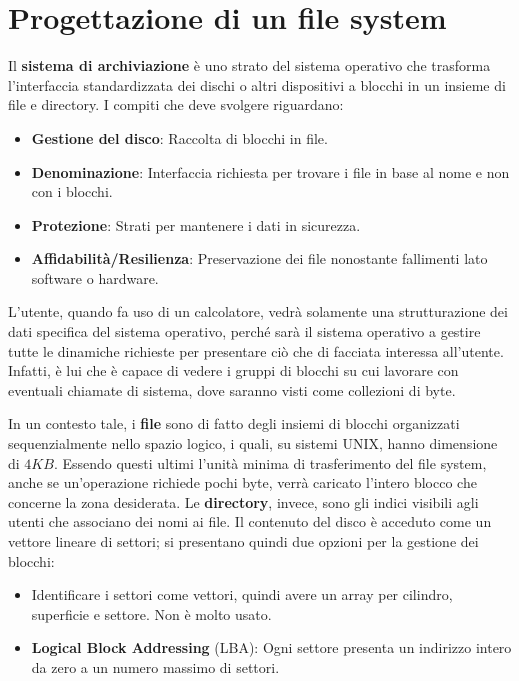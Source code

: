 \section{Progettazione di un file system} %
Il \textbf{sistema di archiviazione} è uno strato del sistema operativo che trasforma l'interfaccia standardizzata dei dischi o altri dispositivi a
blocchi in un insieme di file e directory. I compiti che deve svolgere riguardano: \begin{itemize}
    \item \textbf{Gestione del disco}: Raccolta di blocchi in file.
    \item \textbf{Denominazione}: Interfaccia richiesta per trovare i file in base al nome e non con i blocchi.
    \item \textbf{Protezione}: Strati per mantenere i dati in sicurezza.
    \item \textbf{Affidabilità/Resilienza}: Preservazione dei file nonostante fallimenti lato software o hardware.
\end{itemize}

\noindent L'utente, quando fa uso di un calcolatore, vedrà solamente una strutturazione dei dati specifica del sistema operativo, perché sarà il sistema
operativo a gestire tutte le dinamiche richieste per presentare ciò che di facciata interessa all'utente. Infatti, è lui che è capace di vedere i gruppi
di blocchi su cui lavorare con eventuali chiamate di sistema, dove saranno visti come collezioni di byte.\par
In un contesto tale, i \textbf{file} sono di fatto degli insiemi di blocchi organizzati sequenzialmente nello spazio logico, i quali, su sistemi UNIX,
hanno dimensione di $4KB$. Essendo questi ultimi l'unità minima di trasferimento del file system, anche se un'operazione richiede pochi byte, verrà
caricato l'intero blocco che concerne la zona desiderata. Le \textbf{directory}, invece, sono gli indici visibili agli utenti che associano dei nomi ai
file. Il contenuto del disco è acceduto come un vettore lineare di settori; si presentano quindi due opzioni per la gestione dei blocchi:
\begin{itemize}
    \item Identificare i settori come vettori, quindi avere un array per cilindro, superficie e settore. Non è molto usato.
    \item \textbf{Logical Block Addressing} (LBA): Ogni settore presenta un indirizzo intero da zero a un numero massimo di settori.
\end{itemize}

